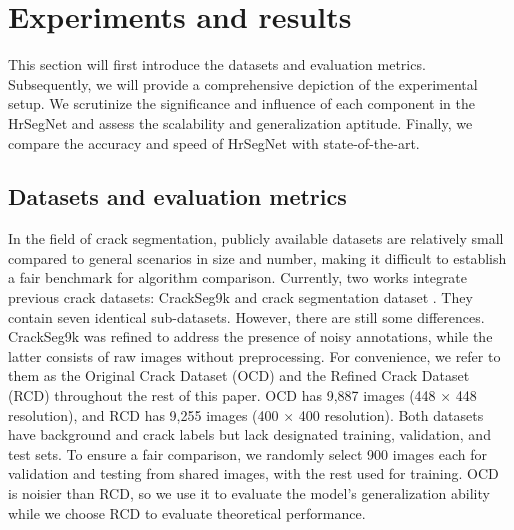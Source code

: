 \documentclass[preprint,12pt,authoryear]{elsarticle}
\begin{document}
\section{Experiments and results}
\label{sec:Experimentsandresults}






This section will first introduce the datasets and evaluation metrics. Subsequently, we will provide a comprehensive depiction of the experimental setup. We scrutinize the significance and influence of each component in the HrSegNet and assess the scalability and generalization aptitude. Finally, we compare the accuracy and speed of HrSegNet with state-of-the-art.


\subsection{Datasets and evaluation metrics}
\label{subsec:datasets}

In the field of crack segmentation, publicly available datasets are relatively small compared to general scenarios in size and number, making it difficult to establish a fair benchmark for algorithm comparison. Currently, two works integrate previous crack datasets: CrackSeg9k \citep{kulkarni_crackseg9k_2022} and crack segmentation dataset \citep{benz_crack_2019}. They contain seven identical sub-datasets. However, there are still some differences. CrackSeg9k was refined to address the presence of noisy annotations, while the latter consists of raw images without preprocessing. For convenience, we refer to them as the Original Crack Dataset (OCD) and the Refined Crack Dataset (RCD) throughout the rest of this paper. 
OCD has 9,887 images (448 × 448 resolution), and RCD has 9,255 images (400 × 400 resolution). Both datasets have background and crack labels but lack designated training, validation, and test sets. To ensure a fair comparison, we randomly select 900 images each for validation and testing from shared images, with the rest used for training. OCD is noisier than RCD, so we use it to evaluate the model's generalization ability while we choose RCD to evaluate theoretical performance.
\end{document}
